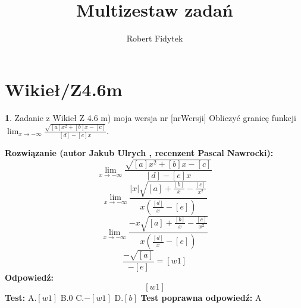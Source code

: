 \documentclass[12pt, a4paper]{article}
\title{Multizestaw zadań}
\author{Robert Fidytek}
\date{}
\theoremstyle{definition} %
\newtheorem{zad}{}
\newcommand{\kategoria}[1]{\section{#1}} %
\newcommand{\zadStart}[1]{\begin{zad}#1\newline} %
\newcommand{\zadStop}{\end{zad}}   %
\newcommand{\rozwStart}[2]{\noindent \textbf{Rozwiązanie (autor #1 , recenzent #2): }\newline} %
\newcommand{\rozwStop}{\newline}                                            %
\newcommand{\odpStart}{\noindent \textbf{Odpowiedź:}\newline}    %
\newcommand{\odpStop}{\newline}                                             %
\newcommand{\testStart}{\noindent \textbf{Test:}\newline} %
\newcommand{\testStop}{\newline} %
\newcommand{\kluczStart}{\noindent \textbf{Test poprawna odpowiedź:}\newline} %
\newcommand{\kluczStop}{\newline} %
\begin{document}
\maketitle


\kategoria{Wikieł/Z4.6m}
\zadStart{Zadanie z Wikieł Z 4.6 m) moja wersja nr [nrWersji]}
Obliczyć granicę funkcji $\lim_{x \to -\infty}\frac{\sqrt{[a]x^{2}+[b]x-[c]}}{[d]-[e]x}$.
\zadStop
\rozwStart{Jakub Ulrych}{Pascal Nawrocki}
$$\lim_{x \to -\infty}\frac{\sqrt{[a]x^{2}+[b]x-[c]}}{[d]-[e]x}$$
$$\lim_{x \to -\infty}\frac{|x|\sqrt{[a]+\frac{[b]}{x}-\frac{[c]}{x^{2}}}}{x(\frac{[d]}{x}-[e])}$$
$$\lim_{x \to -\infty}\frac{-x\sqrt{[a]+\frac{[b]}{x}-\frac{[c]}{x^{2}}}}{x(\frac{[d]}{x}-[e])}$$
$$\frac{-\sqrt{[a]}}{-[e]}=[w1]$$
\rozwStop
\odpStart
$$[w1]$$
\odpStop
\testStart
A.$[w1]$
B.$0$
C.$-[w1]$
D.$[b]$
\testStop
\kluczStart
A
\kluczStop
\end{document}
